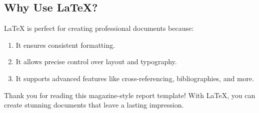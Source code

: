 \documentclass[11pt,a4paper,twoside]{paper}
\begin{document}
\begin{multicols}{2}
\vspace{1em}
\subsection{Why Use LaTeX?}
LaTeX is perfect for creating professional documents because:
\begin{enumerate}
    \item It ensures consistent formatting.
    \item It allows precise control over layout and typography.
    \item It supports advanced features like cross-referencing, bibliographies, and more.
\end{enumerate}

\vspace{-1em}

\begin{tcolorbox}[magazineBox, title=Closing Remarks]
Thank you for reading this magazine-style report template! With LaTeX, you can create stunning documents that leave a lasting impression.
\end{tcolorbox}



\lipsum[1-4]

\end{multicols}
\end{document}
